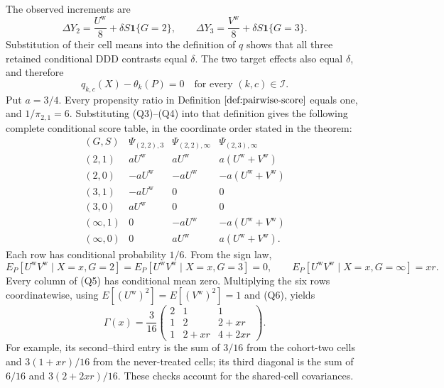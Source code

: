 The observed increments are
\[
 \Delta Y_2=\frac{U^{\mathrm w}}8+\delta S\mathbf 1\{G=2\},
 \qquad
 \Delta Y_3=\frac{V^{\mathrm w}}8+\delta S\mathbf 1\{G=3\}.
\tag{Q3}
\]
Substitution of their cell means into the definition of \(q\) shows that all three retained conditional DDD contrasts equal \(\delta\).  The two target effects also equal \(\delta\), and therefore
\[
 q_{k,c}(X)-\theta_k(P)=0
 \quad\text{for every }(k,c)\in\mathcal I.
\tag{Q4}
\]
Put \(a=3/4\).  Every propensity ratio in Definition \(\ref{def:pairwise-score}\) equals one, and \(1/\pi_{2,1}=6\).  Substituting (Q3)--(Q4) into that definition gives the following complete conditional score table, in the coordinate order stated in the theorem:
\[
\begin{array}{c|ccc}
(G,S)&\Psi_{(2,2),3}&\Psi_{(2,2),\infty}&\Psi_{(2,3),\infty}\\ \hline
(2,1)&aU^{\mathrm w}&aU^{\mathrm w}&a(U^{\mathrm w}+V^{\mathrm w})\\
(2,0)&-aU^{\mathrm w}&-aU^{\mathrm w}&-a(U^{\mathrm w}+V^{\mathrm w})\\
(3,1)&-aU^{\mathrm w}&0&0\\
(3,0)&aU^{\mathrm w}&0&0\\
(\infty,1)&0&-aU^{\mathrm w}&-a(U^{\mathrm w}+V^{\mathrm w})\\
(\infty,0)&0&aU^{\mathrm w}&a(U^{\mathrm w}+V^{\mathrm w}).
\end{array}
\tag{Q5}
\]
Each row has conditional probability \(1/6\).  From the sign law,
\[
 E_P[U^{\mathrm w}V^{\mathrm w}\mid X=x,G=2]
 =E_P[U^{\mathrm w}V^{\mathrm w}\mid X=x,G=3]=0,
 \qquad
 E_P[U^{\mathrm w}V^{\mathrm w}\mid X=x,G=\infty]=xr.
\tag{Q6}
\]
Every column of (Q5) has conditional mean zero.  Multiplying the six rows coordinatewise, using \(E[(U^{\mathrm w})^2]=E[(V^{\mathrm w})^2]=1\) and (Q6), yields
\[
 \Gamma(x)=\frac{3}{16}
 \begin{pmatrix}
 2&1&1\\
 1&2&2+xr\\
 1&2+xr&4+2xr
 \end{pmatrix}.
\tag{Q7}
\]
For example, its second--third entry is the sum of \(3/16\) from the cohort-two cells and \(3(1+xr)/16\) from the never-treated cells; its third diagonal is the sum of \(6/16\) and \(3(2+2xr)/16\).  These checks account for the shared-cell covariances.

